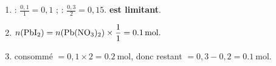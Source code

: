 \documentclass[11pt,a4paper]{article}
\begin{document}
\begin{corrige}
\begin{enumerate}[label=\alph*)]
  \item {} : $\frac{0,1}{1}=0,1$ ;  : $\frac{0,3}{2}=0,15$.
        \textbf{ est limitant}.
  \item $n(\ce{PbI2})=n(\ce{Pb(NO3)2})\times\dfrac{1}{1}=\qty{0.1}{\mole}.$
  \item {} consommé $=0,1\times2=\qty{0.2}{\mole}$, donc restant $=0,3-0,2=\qty{0.1}{\mole}.$
\end{enumerate}
\end{corrige}
\end{document}
